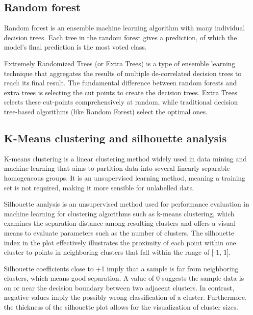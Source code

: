 \subsection{Random forest}

Random forest \cite{598994} is an ensemble machine learning algorithm with many individual decision trees. Each tree in the random forest gives a prediction, of which the model's final prediction is the most voted class.

Extremely Randomized Trees (or Extra Trees) \cite{geurts2006extremely} is a type of ensemble learning technique that aggregates the results of multiple de-correlated decision trees to reach its final result. The fundamental difference between random forests and extra trees is selecting the cut points to create the decision trees. Extra Trees selects these cut-points comprehensively at random, while traditional decision tree-based algorithms (like Random Forest) select the optimal ones.

\subsection{K-Means clustering and silhouette analysis}
\label{subsec:silhouette}

K-means clustering \cite{Wu2012} is a linear clustering method widely used in data mining and machine learning that aims to partition data into several linearly separable homogeneous groups. It is an unsupervised learning method, meaning a training set is not required, making it more sensible for unlabelled data.

Silhouette analysis \cite{10.1007/978-3-319-62416-7_21} is an unsupervised method used for performance evaluation in machine learning for clustering algorithms such as k-means clustering, which examines the separation distance among resulting clusters and offers a visual means to evaluate parameters such as the number of clusters. The silhouette index in the plot effectively illustrates the proximity of each point within one cluster to points in neighboring clusters that fall within the range of [-1, 1].

Silhouette coefficients close to +1 imply that a sample is far from neighboring clusters, which means good separation. A value of 0 suggests the sample data is on or near the decision boundary between two adjacent clusters. In contrast, negative values imply the possibly wrong classification of a cluster. Furthermore, the thickness of the silhouette plot allows for the visualization of cluster sizes.

